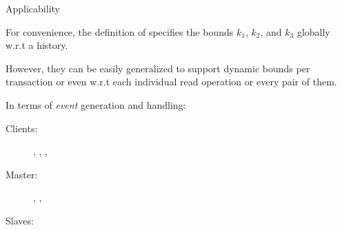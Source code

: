\begin{frame}{Applicability}
\end{frame}

\begin{frame}{}
  \resizebox{1.00\textwidth}{!}{}
\end{frame}

\begin{frame}{}
  For convenience, the definition of \rvsi{} specifies the bounds
  $k_1$, $k_2$, and $k_3$ globally w.r.t a history.

  However, they can be easily generalized to support dynamic bounds per transaction
  or even w.r.t each individual read operation or every pair of them.
\end{frame}

\begin{frame}{}
  In terms of \emph{event} generation and handling:
  \begin{description}
    \item[Clients:] \ebegin, \eread, \ewrite, \eend%
    \item[Master:] \estart, \ecommit, \esend%
    \item[Slaves:] \ereceive%
  \end{description}
\end{frame}

\begin{frame}{}
  \begin{center}
    \begin{minipage}{1.0\textwidth}
      
    \end{minipage}
  \end{center}
\end{frame}

\begin{frame}{}
  \begin{center}
  \end{center}
\end{frame}

\begin{frame}{}
  \begin{center}
    \begin{minipage}{1.0\textwidth}
      
    \end{minipage}
  \end{center}
\end{frame}

